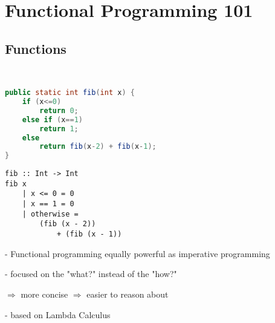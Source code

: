 \section{Functional Programming 101}
\subsection{Functions}
~\\
\begin{minipage}{0.5\textwidth}
\begin{lstlisting}[frame=htrbl, language=java]
public static int fib(int x) {
	if (x<=0)
		return 0;
	else if (x==1)
		return 1;
	else
		return fib(x-2) + fib(x-1);
}
\end{lstlisting}
\end{minipage}
\hfill
\begin{minipage}{0.4\textwidth}
\begin{lstlisting}[frame=htrbl]
fib :: Int -> Int
fib x
	| x <= 0 = 0
	| x == 1 = 0
	| otherwise = 
		(fib (x - 2))
			+ (fib (x - 1))
\end{lstlisting}
\end{minipage}

- Functional programming equally powerful as imperative programming

- focused on the "what?" instead of the "how?"

$\Rightarrow$ more concise $\Rightarrow$ easier to reason about

- based on Lambda Calculus

\frbreak